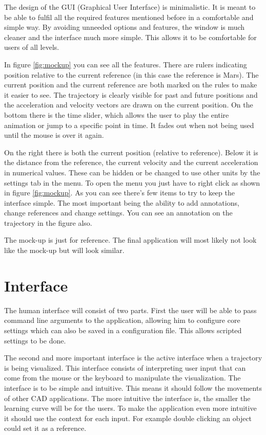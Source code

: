 \documentclass[a4paper,11pt]{article}
\begin{document}
The design of the GUI (Graphical User Interface) is minimalistic. It is meant to be able to fulfil all the required features mentioned before in a comfortable and simple way. By avoiding unneeded options and features, the window is much cleaner and the interface much more simple. This allows it to be comfortable for users of all levels.

In figure \ref{fig:mockup} you can see all the features. There are rulers indicating position relative to the current reference (in this case the reference is Mars). The current position and the current reference are both marked on the rules to make it easier to see. The trajectory is clearly visible for past and future positions and the acceleration and velocity vectors are drawn on the current position. On the bottom there is the time slider, which allows the user to play the entire animation or jump to a specific point in time. It fades out when not being used until the mouse is over it again.

On the right there is both the current position (relative to reference). Below it is the distance from the reference, the current velocity and the current acceleration in numerical values. These can be hidden or be changed to use other units by the settings tab in the menu. To open the menu you just have to right click as shown in figure \ref{fig:mockup}. As you can see there's few items to try to keep the interface simple. The most important being the ability to add annotations, change references and change settings. You can see an annotation on the trajectory in the figure also.

The mock-up is just for reference. The final application will most likely not look like the mock-up but will look similar. 


\section{Interface}

The human interface will consist of two parts. First the user will be able to pass command line arguments to the application, allowing him to configure core settings which can also be saved in a configuration file. This allows scripted settings to be done.

The second and more important interface is the active interface when a trajectory is being visualized. This interface consists of interpreting user input that can come from the mouse or the keyboard to manipulate the visualization. The interface is to be simple and intuitive. This means it should follow the movements of other CAD applications. The more intuitive the interface is, the smaller the learning curve will be for the users. To make the application even more intuitive it should use the context for each input. For example double clicking an object could set it as a reference.
\end{document}
